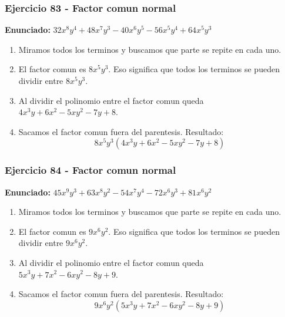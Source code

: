\documentclass[11pt,a4paper]{article}
\begin{document}
\subsubsection*{Ejercicio 83 - Factor comun normal}
\textbf{Enunciado:} $ 32 x^{8} y^{4} + 48 x^{7} y^{3} - 40 x^{6} y^{5} - 56 x^{5} y^{4} + 64 x^{5} y^{3} $\par
\begin{enumerate}[leftmargin=2em]
\item Miramos todos los terminos y buscamos que parte se repite en cada uno.
\item El factor comun es \(8 x^{5} y^{3}\). Eso significa que todos los terminos se pueden dividir entre \(8 x^{5} y^{3}\).
\item Al dividir el polinomio entre el factor comun queda \(4 x^{3} y + 6 x^{2} - 5 x y^{2} - 7 y + 8\).
\item Sacamos el factor comun fuera del parentesis. Resultado: \[\boxed{8 x^{5} y^{3}\left(4 x^{3} y + 6 x^{2} - 5 x y^{2} - 7 y + 8\right)}\]
\end{enumerate}

\vspace{0.2cm}
\subsubsection*{Ejercicio 84 - Factor comun normal}
\textbf{Enunciado:} $ 45 x^{9} y^{3} + 63 x^{8} y^{2} - 54 x^{7} y^{4} - 72 x^{6} y^{3} + 81 x^{6} y^{2} $\par
\begin{enumerate}[leftmargin=2em]
\item Miramos todos los terminos y buscamos que parte se repite en cada uno.
\item El factor comun es \(9 x^{6} y^{2}\). Eso significa que todos los terminos se pueden dividir entre \(9 x^{6} y^{2}\).
\item Al dividir el polinomio entre el factor comun queda \(5 x^{3} y + 7 x^{2} - 6 x y^{2} - 8 y + 9\).
\item Sacamos el factor comun fuera del parentesis. Resultado: \[\boxed{9 x^{6} y^{2}\left(5 x^{3} y + 7 x^{2} - 6 x y^{2} - 8 y + 9\right)}\]
\end{enumerate}

\vspace{0.2cm}
\end{document}
